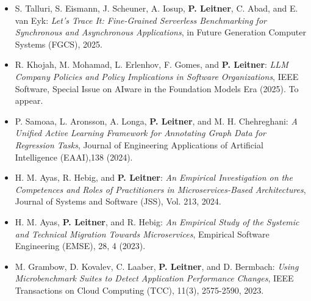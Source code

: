 \documentclass[paper=letter,fontsize=11pt]{scrartcl} %
\begin{document}
\begin{itemize}
  \item S. Talluri, S. Eismann, J. Scheuner, A. Iosup, \textbf{P. Leitner}, C. Abad, and E. van Eyk: \emph{Let's Trace It: Fine-Grained Serverless Benchmarking for Synchronous and Asynchronous Applications}, in Future Generation Computer Systems (FGCS), 2025. 
  \item R. Khojah, M. Mohamad, L. Erlenhov, F. Gomes, and \textbf{P. Leitner}: \emph{LLM Company Policies and Policy Implications in Software Organizations}, IEEE Software, Special Issue on AIware in the Foundation Models Era (2025). To appear.
  \item P. Samoaa, L. Aronsson, A. Longa,  \textbf{P. Leitner}, and M. H. Chehreghani: \emph{A Unified Active Learning Framework for Annotating Graph Data for Regression Tasks}, Journal of Engineering Applications of Artificial Intelligence (EAAI),138 (2024). 
  \item H. M. Ayas, R. Hebig, and \textbf{P. Leitner}: \emph{An Empirical Investigation on the Competences and Roles of Practitioners in Microservices-Based Architectures}, Journal of Systems and Software (JSS), Vol. 213, 2024.  
  \item H. M. Ayas, \textbf{P. Leitner}, and R. Hebig: \emph{An Empirical Study of the Systemic and Technical Migration Towards Microservices}, Empirical Software Engineering (EMSE), 28, 4 (2023). 
  \item M. Grambow, D. Kovalev, C. Laaber, \textbf{P. Leitner}, and D. Bermbach: \emph{Using Microbenchmark Suites to Detect Application Performance Changes}, IEEE Transactions on Cloud Computing (TCC), 11(3), 2575-2590, 2023.   

\end{itemize}
\end{document}
